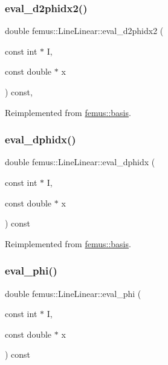 \subsubsection{\texorpdfstring{eval\+\_\+d2phidx2()}{eval\_d2phidx2()}}
{\footnotesize\ttfamily double femus\+::\+Line\+Linear\+::eval\+\_\+d2phidx2 (\begin{DoxyParamCaption}\item[{const int $\ast$}]{I,  }\item[{const double $\ast$}]{x }\end{DoxyParamCaption}) const\hspace{0.3cm}{\ttfamily [inline]}, {\ttfamily [virtual]}}



Reimplemented from \mbox{\hyperlink{classfemus_1_1basis_a0a9839e75d1c9c8302486fc072eed028}{femus\+::basis}}.

\mbox{\label{classfemus_1_1_line_linear_a1f690ee24508fe7e2a3b552bf6921e96}} 
\subsubsection{\texorpdfstring{eval\+\_\+dphidx()}{eval\_dphidx()}}
{\footnotesize\ttfamily double femus\+::\+Line\+Linear\+::eval\+\_\+dphidx (\begin{DoxyParamCaption}\item[{const int $\ast$}]{I,  }\item[{const double $\ast$}]{x }\end{DoxyParamCaption}) const\hspace{0.3cm}{\ttfamily [virtual]}}



Reimplemented from \mbox{\hyperlink{classfemus_1_1basis_a4db7d29cf8a753ddbccc4a297dafa0bf}{femus\+::basis}}.

\mbox{\label{classfemus_1_1_line_linear_a1daec56d3bf6106b18291be2adadb3c5}} 
\subsubsection{\texorpdfstring{eval\+\_\+phi()}{eval\_phi()}}
{\footnotesize\ttfamily double femus\+::\+Line\+Linear\+::eval\+\_\+phi (\begin{DoxyParamCaption}\item[{const int $\ast$}]{I,  }\item[{const double $\ast$}]{x }\end{DoxyParamCaption}) const\hspace{0.3cm}{\ttfamily [virtual]}}



